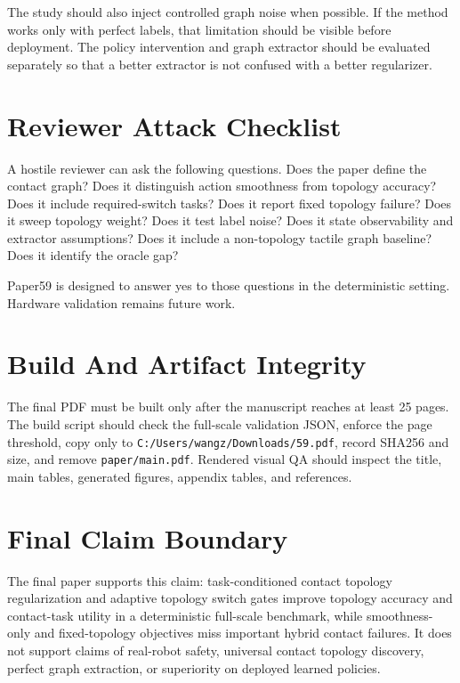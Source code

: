 \documentclass{article}
\begin{document}
The study should also inject controlled graph noise when possible. If the method works only with perfect labels, that limitation should be visible before deployment. The policy intervention and graph extractor should be evaluated separately so that a better extractor is not confused with a better regularizer.

\section{Reviewer Attack Checklist}

A hostile reviewer can ask the following questions. Does the paper define the contact graph? Does it distinguish action smoothness from topology accuracy? Does it include required-switch tasks? Does it report fixed topology failure? Does it sweep topology weight? Does it test label noise? Does it state observability and extractor assumptions? Does it include a non-topology tactile graph baseline? Does it identify the oracle gap?

Paper59 is designed to answer yes to those questions in the deterministic setting. Hardware validation remains future work.

\section{Build And Artifact Integrity}

The final PDF must be built only after the manuscript reaches at least 25 pages. The build script should check the full-scale validation JSON, enforce the page threshold, copy only to \texttt{C:/Users/wangz/Downloads/59.pdf}, record SHA256 and size, and remove \texttt{paper/main.pdf}. Rendered visual QA should inspect the title, main tables, generated figures, appendix tables, and references.

\section{Final Claim Boundary}

The final paper supports this claim: task-conditioned contact topology regularization and adaptive topology switch gates improve topology accuracy and contact-task utility in a deterministic full-scale benchmark, while smoothness-only and fixed-topology objectives miss important hybrid contact failures. It does not support claims of real-robot safety, universal contact topology discovery, perfect graph extraction, or superiority on deployed learned policies.
\end{document}
